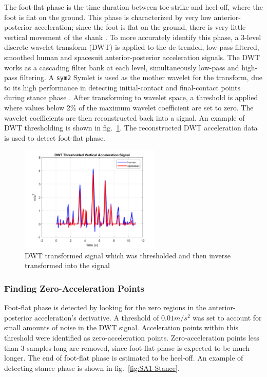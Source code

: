 \documentclass[defaultstyle,11pt]{comps}
\begin{document}
The foot-flat phase is the time duration between toe-strike and heel-off, where the foot is flat on the ground.
This phase is characterized by very low anterior-posterior acceleration; since the foot is flat on the ground, there is very little vertical movement of the shank \citep{Rebula2013}.
To more accurately identify this phase, a 3-level discrete wavelet transform (DWT) is applied to the de-trended, low-pass filtered, smoothed human and spacesuit anterior-posterior acceleration signals.
The DWT works as a cascading filter bank at each level, simultaneously low-pass and high-pass filtering.
A \texttt{sym2} Symlet is used as the mother wavelet for the transform, due to its high performance in detecting initial-contact and final-contact points during stance phase \citep{Ji2019}.
After transforming to wavelet space, a threshold is applied where values below 2\% of the maximum wavelet coefficient are set to zero.
The wavelet coefficients are then reconstructed back into a signal. An example of DWT thresholding is shown in fig.~\ref{fig:SA1-DWT}. The reconstructed DWT acceleration data is used to detect foot-flat phase.

\begin{figure}
\hypertarget{fig:SA1-DWT}{%
\centering
\includegraphics[width=0.6\textwidth,height=\textheight]{../fig/SA1/S3C0T1R_DWT.png}
\caption{DWT transformed signal which was thresholded and then inverse transformed into the signal}\label{fig:SA1-DWT}
}
\end{figure}

\hypertarget{finding-zero-acceleration-points}{%
\subsubsection{Finding Zero-Acceleration Points}\label{finding-zero-acceleration-points}}

Foot-flat phase is detected by looking for the zero regions in the anterior-posterior acceleration's derivative\citep{Mariani2013}.
A threshold of \(0.01 m/s^{2}\) was set to account for small amounts of noise in the DWT signal.
Acceleration points within this threshold were identified as zero-acceleration points.
Zero-acceleration points less than 3-samples long are removed, since foot-flat phase is expected to be much longer.
The end of foot-flat phase is estimated to be heel-off. An example of detecting stance phase is shown in fig.~\ref{fig:SA1-Stance}.
\end{document}
